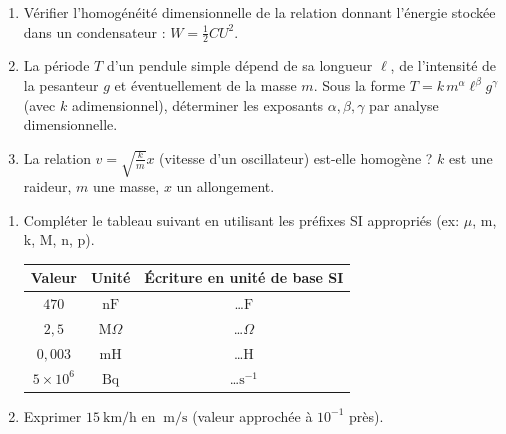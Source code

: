 \documentclass[11pt]{article}
\begin{document}
\begin{exercice}
\begin{enumerate}
    \item Vérifier l'homogénéité dimensionnelle de la relation donnant l'énergie stockée dans un condensateur : $W = \frac{1}{2} C U^2$.
    \item La période $T$ d'un pendule simple dépend de sa longueur $\ell$, de l'intensité de la pesanteur $g$ et éventuellement de la masse $m$. Sous la forme $T = k\, m^\alpha \ell^\beta g^\gamma$ (avec $k$ adimensionnel), déterminer les exposants $\alpha, \beta, \gamma$ par analyse dimensionnelle.
    \item La relation $v = \sqrt{\frac{k}{m}} x$ (vitesse d'un oscillateur) est-elle homogène ? $k$ est une raideur, $m$ une masse, $x$ un allongement.
\end{enumerate}
\end{exercice}

\begin{exercice}
\begin{enumerate}
    \item Compléter le tableau suivant en utilisant les préfixes SI appropriés (ex: $\mu$, m, k, M, n, p).
    \begin{center}
    \begin{tabular}{|c|c|c|}
    \hline
    Valeur & Unité & Écriture en unité de base SI \\
    \hline
    $470$ & $\text{nF}$ & \ldots $\text{F}$ \\
    $2,5$ & $\text{M}\Omega$ & \ldots $\Omega$ \\
    $0,003$ & $\text{mH}$ & \ldots $\text{H}$ \\
    $5 \times 10^6$ & $\text{Bq}$ & \ldots $\text{s}^{-1}$ \\
    \hline
    \end{tabular}
    \end{center}
    \item Exprimer $\SI{15}{\kilo\metre\per\hour}$ en $\SI{}{\metre\per\second}$ (valeur approchée à $10^{-1}$ près).
\end{enumerate}
\end{exercice}
\end{document}
